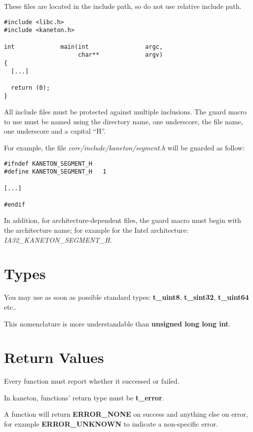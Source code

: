 These files are located in the include path, so do not use relative include
path.

\begin{verbatim}
#include <libc.h>
#include <kaneton.h>

int             main(int                argc,
                     char**             argv)
{
  [...]

  return (0);
}
\end{verbatim}

All include files must be protected against multiple inclusions. The
guard macro to use must be named using the directory name, one underscore,
the file name, one underscore and a capital ``H''.

For example, the file \textit{core/include/kaneton/segment.h} will be
guarded as follow:

\begin{verbatim}
#ifndef KANETON_SEGMENT_H
#define KANETON_SEGMENT_H	1

[...]

#endif
\end{verbatim}

In addition, for architecture-dependent files, the guard macro must begin
with the architecture name; for example for the Intel architecture:
\textit{IA32\_KANETON\_SEGMENT\_H}.

%
%

\section{Types}

You may use as soon as possible standard types: \textbf{t\_uint8},
\textbf{t\_sint32}, \textbf{t\_uint64} etc..

This nomenclature is more understandable than
\textbf{unsigned long long int}.

%
%

\section{Return Values}

Every function must report whether it successed or failed.

In kaneton, functions' return type must be \textbf{t\_error}.

A function will return \textbf{ERROR\_NONE} on success and anything
else on error, for example \textbf{ERROR\_UNKNOWN} to indicate a non-specific
error.


